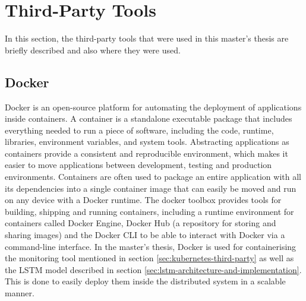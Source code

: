 \section{Third-Party Tools}
\label{sec:third-party-tools-architecture}

  In this section, the third-party tools that were used in this master's thesis are briefly described and also where they were used.

\subsection{Docker}
\label{sec:docker-third-party}

  Docker \cite{dockerDockerDocumentationOverview2023} is an open-source platform for automating the deployment of applications inside containers. A container is a standalone executable package that includes everything needed to run a piece of software, including the code, runtime, libraries, environment variables, and system tools.
  Abstracting applications as containers provide a consistent and reproducible environment, which makes it easier to move applications between development, testing and production environments.
  Containers are often used to package an entire application with all its dependencies into a single container image that can easily be moved and run on any device with a Docker runtime.
  The docker toolbox provides tools for building, shipping and running containers, including a runtime environment for containers called Docker Engine, Docker Hub (a repository for storing and sharing images) and the Docker CLI to be able to interact with Docker via a command-line interface.
  In the master's thesis, Docker is used for containerising the monitoring tool mentioned in section \ref{sec:kubernetes-third-party} as well as the LSTM model described in section \ref{sec:lstm-architecture-and-implementation}.
  This is done to easily deploy them inside the distributed system in a scalable manner. 

